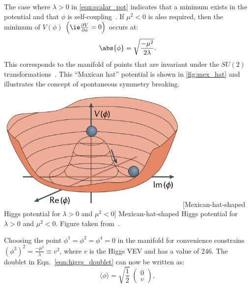 The case where $\lambda > 0$ in \cref{eqn:scalar_pot} indicates that a minimum exists in the potential and that $\phi$ is self-coupling~\cite{bass_higgs_2021}.
If $\mu^2 < 0$ is also required, then the minimum of $V(\phi)$ $\left( \ie \frac{\partial V}{\partial \phi} = 0 \right)$ occurs at:
\begin{equation}
    \abs{\phi} = \sqrt{ \frac{-\mu^2}{2\lambda} }.
    \label{eqn:higgs_min}
\end{equation}
This corresponds to the manifold of points that are invariant under the $SU(2)$ transformations~\cite{Halzen:1984mc}.
This ``Maxican hat'' potential is shown in \cref{fig:mex_hat} and illustrates the concept of spontaneous symmetry breaking.
\begin{multiFigure}
    \centering
        \includegraphics[height=6cm,keepaspectratio]{figures/sm/higgs_potential.png}
        [Mexican-hat-shaped Higgs potential for $\lambda > 0$ and $\mu^2 < 0$]
        {Mexican-hat-shaped Higgs potential for $\lambda > 0$ and $\mu^2 < 0$.
        Figure taken from~\cite{bass_higgs_2021}.} 
    \label{fig:mex_hat}
\end{multiFigure}
Choosing the point $\phi^1 = \phi^2 = \phi^4 = 0$ in the manifold for convenience constrains $\left(\phi^3\right)^2 = \frac{-\mu^2}{\lambda} \equiv v^2$,
where $v$ is the Higgs VEV and has a value of 246\GeV. %
The doublet in Eqn.~\ref{eqn:higgs_doublet} can now be written as:
\begin{equation*}
    \langle\phi\rangle = \sqrt{\frac{1}{2}}
    \hspace{3pt}
    \begin{pmatrix}
        0 
        \\
        v 
    \end{pmatrix},
\end{equation*}
